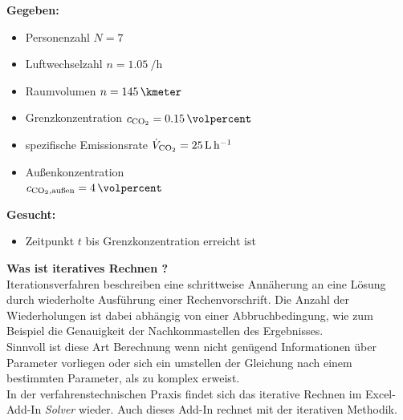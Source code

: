\begin{minipage}[t]{0.45\textwidth}
	\textbf{Gegeben:}
	\begin{itemize}
		\item Personenzahl $N = 7$
		\item Luftwechselzahl $n = \SI{1,05}{\per \hour}$
		\item Raumvolumen $n = \SI{145}{\kmeter}$
		\item Grenzkonzentration $c_{\ce{CO2}} = \SI{0,15}{\volpercent}$
	\end{itemize}
\end{minipage}
\begin{minipage}[t]{0.5\textwidth}
	\textbf{}
	\begin{itemize}
		\item spezifische Emissionsrate $\dot{V}_{\ce{CO2}} = \SI{25}{\liter \per \hour} $
		\item Außenkonzentration  \\
		$c_{\ce{CO2}, \text{außen}} = \SI{4}{\volpercent}$
	\end{itemize}
\end{minipage}
\FloatBarrier

\vspace*{5mm}

\begin{minipage}[t]{1.0\textwidth}
	\textbf{Gesucht:}
	\begin{itemize}
		\item Zeitpunkt $t$ bis Grenzkonzentration erreicht ist
	\end{itemize}
\end{minipage}

\newpage

\textbf{Was ist iteratives Rechnen ?}\\
Iterationsverfahren beschreiben eine schrittweise Annäherung an eine Lösung durch wiederholte Ausführung einer Rechenvorschrift. Die Anzahl der Wiederholungen ist dabei abhängig von einer Abbruchbedingung, wie zum Beispiel die Genauigkeit der Nachkommastellen des Ergebnisses.\\
Sinnvoll ist diese Art Berechnung wenn nicht genügend Informationen über Parameter vorliegen oder sich ein umstellen der Gleichung nach einem bestimmten Parameter, als zu komplex erweist. \\
In der verfahrenstechnischen Praxis findet sich das iterative Rechnen im Excel-Add-In \textit{Solver} wieder. Auch dieses Add-In rechnet mit der iterativen Methodik.

